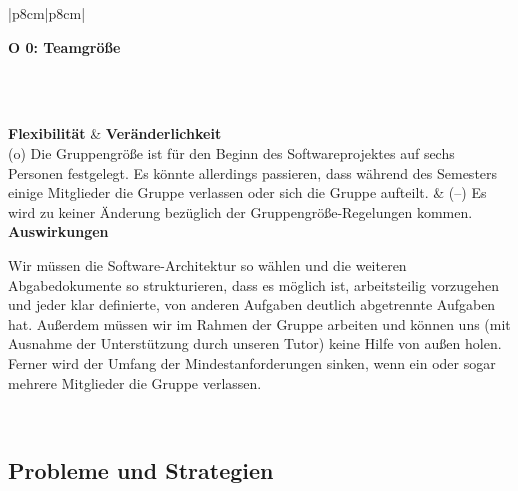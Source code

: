 \documentclass[enabledeprecatedfontcommands,fontsize=11pt,paper=a4,twoside]{scrartcl}
\newcounter{one}
\newcommand{\tone}{0\theone}
\begin{document}
\newpage
\begin{tabular} {|p{8cm}|p{8cm}|}
	\hline
	 {\parbox{16cm}{\textbf{\hypertarget{xx}{O \tone}: Teamgröße}} }\\ \hline \hline
	\rule{0pt}{1ex}\\ \hline
	\textbf{Flexibilität}  & \textbf{Veränderlichkeit} \\
	(o) Die Gruppengröße ist für den Beginn des Softwareprojektes auf sechs Personen festgelegt. Es könnte allerdings passieren, dass während des Semesters einige Mitglieder die Gruppe verlassen oder sich die Gruppe aufteilt. &
	(--) Es wird zu keiner Änderung bezüglich der Gruppengröße-Regelungen kommen. \\ \hline
	 {\textbf{Auswirkungen}} \\
	 {\parbox{16cm}{Wir müssen die Software-Architektur so wählen und die weiteren Abgabedokumente so strukturieren, dass es möglich ist, arbeitsteilig vorzugehen und jeder klar definierte, von anderen Aufgaben deutlich abgetrennte Aufgaben hat. Außerdem müssen wir im Rahmen der Gruppe arbeiten und können uns (mit Ausnahme der Unterstützung durch unseren Tutor) keine Hilfe von außen holen. Ferner wird der Umfang der Mindestanforderungen sinken, wenn ein oder sogar mehrere Mitglieder die Gruppe verlassen. }}\\ \hline
\end{tabular}\newpage
\newpage



\subsection{Probleme und Strategien}
\label{sec:strategien}
\end{document}
